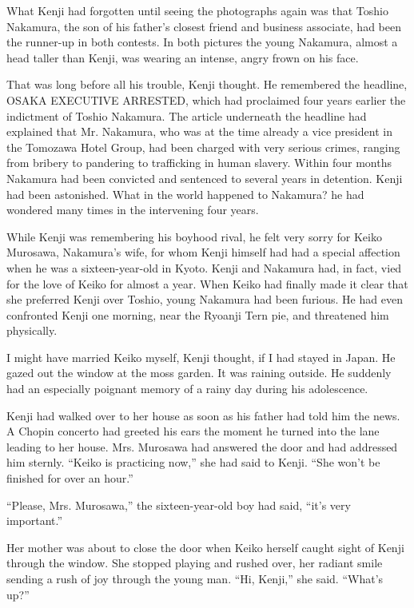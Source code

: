 \documentclass[]{article}
\begin{document}
{What Kenji had forgotten until seeing the photographs again was that Toshio Nakamura, the son of his father’s closest friend and business associate, had been the runner-up in both contests. In both pictures the young Nakamura, almost a head taller than Kenji, was wearing an intense, angry frown on his face.

That was long before all his trouble, Kenji thought. He remembered the headline, OSAKA EXECUTIVE ARRESTED, which had proclaimed four years earlier the indictment of Toshio Nakamura. The article underneath the headline had explained that Mr. Nakamura, who was at the time already a vice president in the Tomozawa Hotel Group, had been charged with very serious crimes, ranging from bribery to pandering to trafficking in human slavery. Within four months Nakamura had been convicted and sentenced to several years in detention. Kenji had been astonished. What in the world happened to Nakamura? he had wondered many times in the intervening four years.

While Kenji was remembering his boyhood rival, he felt very sorry for Keiko Murosawa, Nakamura’s wife, for whom Kenji himself had had a special affection when he was a sixteen-year-old in Kyoto. Kenji and Nakamura had, in fact, vied for the love of Keiko for almost a year. When Keiko had finally made it clear that she preferred Kenji over Toshio, young Nakamura had been furious. He had even confronted Kenji one morning, near the Ryoanji Tern pie, and threatened him physically.

I might have married Keiko myself, Kenji thought, if I had stayed in Japan. He gazed out the window at the moss garden. It was raining outside. He suddenly had an especially poignant memory of a rainy day during his adolescence.

Kenji had walked over to her house as soon as his father had told him the news. A Chopin concerto had greeted his ears the moment he turned into the lane leading to her house. Mrs. Murosawa had answered the door and had addressed him sternly. “Keiko is practicing now,” she had said to Kenji. “She won’t be finished for over an hour.”

“Please, Mrs. Murosawa,” the sixteen-year-old boy had said, “it’s very important.”

Her mother was about to close the door when Keiko herself caught sight of Kenji through the window. She stopped playing and rushed over, her radiant smile sending a rush of joy through the young man. “Hi, Kenji,” she said. “What’s up?”

}
\end{document}
